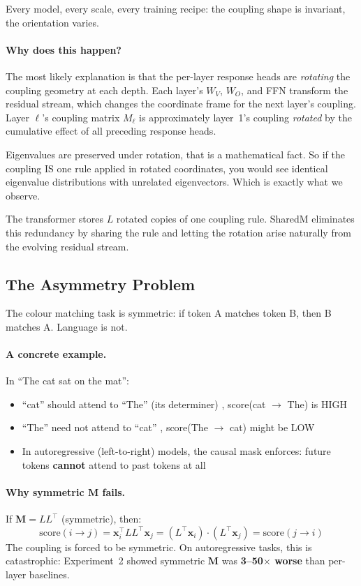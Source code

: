 \documentclass[11pt, a4paper]{article}
\newcommand{\M}{\mathbf{M}}
\newcommand{\x}{\mathbf{x}}
\theoremstyle{remark}
\begin{document}
Every model, every scale, every training recipe: the coupling shape is invariant, the orientation varies.

\paragraph{Why does this happen?}
The most likely explanation is that the per-layer response heads are \emph{rotating} the coupling geometry at each depth.
Each layer's $W_V$, $W_O$, and FFN transform the residual stream, which changes the coordinate frame for the next layer's coupling.
Layer $\ell$'s coupling matrix $M_\ell$ is approximately layer~1's coupling \emph{rotated} by the cumulative effect of all preceding response heads.

Eigenvalues are preserved under rotation, that is a mathematical fact.
So if the coupling IS one rule applied in rotated coordinates, you would see identical eigenvalue distributions with unrelated eigenvectors.
Which is exactly what we observe.

The transformer stores $L$ rotated copies of one coupling rule.
SharedM eliminates this redundancy by sharing the rule and letting the rotation arise naturally from the evolving residual stream.

\subsection{The Asymmetry Problem}
\label{sec:grn:asymmetry}

The colour matching task is symmetric: if token A matches token B, then B matches A.
Language is not.

\paragraph{A concrete example.}
In ``The cat sat on the mat'':
\begin{itemize}[nosep]
    \item ``cat'' should attend to ``The'' (its determiner) ,  score(cat $\to$ The) is HIGH
    \item ``The'' need not attend to ``cat'' ,  score(The $\to$ cat) might be LOW
    \item In autoregressive (left-to-right) models, the causal mask enforces: future tokens \textbf{cannot} attend to past tokens at all
\end{itemize}

\paragraph{Why symmetric $\M$ fails.}
If $\M = LL^\top$ (symmetric), then:
\[
    \text{score}(i \to j) = \x_i^\top LL^\top \x_j = (L^\top \x_i) \cdot (L^\top \x_j) = \text{score}(j \to i)
\]
The coupling is forced to be symmetric.
On autoregressive tasks, this is catastrophic: Experiment~2 showed symmetric $\M$ was \textbf{3--50$\times$ worse} than per-layer baselines.
\end{document}
